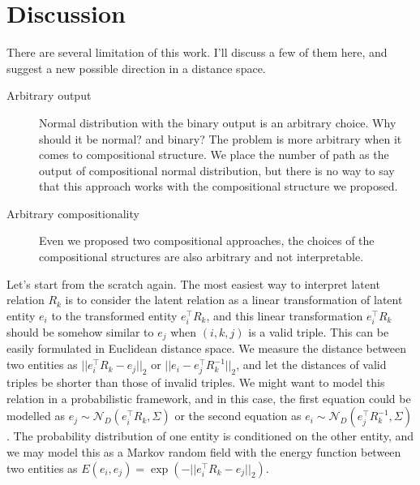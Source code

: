 \documentclass{article}
\begin{document}


\section{Discussion}
There are several limitation of this work. I'll discuss a few of them here, and suggest a new possible direction in a distance space.
\begin{description}
\item[Arbitrary output] Normal distribution with the binary output is an arbitrary choice. Why should it be normal? and binary? The problem is more arbitrary when it comes to compositional structure. We place the number of path as the output of compositional normal distribution, but there is no way to say that this approach works with the compositional structure we proposed.
\item[Arbitrary compositionality] Even we proposed two compositional approaches, the choices of the compositional structures are also arbitrary and not interpretable.
\end{description}

Let's start from the scratch again. The most easiest way to interpret latent relation $R_k$ is to consider the latent relation as a linear transformation of latent entity $e_i$ to the transformed entity $e_i^\top R_k$, and this linear transformation $e_i^\top R_k$ should be somehow similar to $e_j$ when $(i, k, j)$ is a valid triple. This can be easily formulated in Euclidean distance space. We measure the distance between two entities as $|| e_i^\top R_k - e_j ||_2$ or $|| e_i - e_j^\top R_k^{-1} ||_2$, and let the distances of valid triples be shorter than those of invalid triples. We might want to model this relation in a probabilistic framework, and in this case, the first equation could be modelled as $e_j \sim \mathcal{N}_D(e_i^\top R_k, \Sigma)$ or the second equation as $e_i \sim \mathcal{N}_D(e_j^\top R_k^{-1}, \Sigma)$. The probability distribution of one entity is conditioned on the other entity, and we may model this as a Markov random field with the energy function between two entities as $E(e_i, e_j) = \exp(-||e_i^\top R_k - e_j||_2)$.
\end{document}
